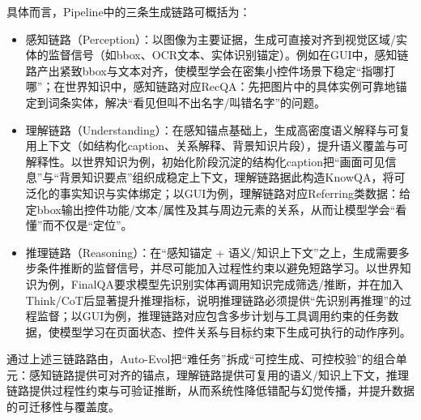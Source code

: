 具体而言，Pipeline中的三条生成链路可概括为：
\begin{itemize}
  \item 感知链路（Perception）：以图像为主要证据，生成可直接对齐到视觉区域/实体的监督信号（如bbox、OCR文本、实体识别锚定）。例如在GUI中，感知链路产出紧致bbox与文本对齐，使模型学会在密集小控件场景下稳定“指哪打哪”；在世界知识中，感知链路对应RecQA：先把图片中的具体实例可靠地锚定到词条实体，解决“看见但叫不出名字/叫错名字”的问题。
  \item 理解链路（Understanding）：在感知锚点基础上，生成高密度语义解释与可复用上下文（如结构化caption、关系解释、背景知识片段），提升语义覆盖与可解释性。以世界知识为例，初始化阶段沉淀的结构化caption把“画面可见信息”与“背景知识要点”组织成稳定上下文，理解链路据此构造KnowQA，将可泛化的事实知识与实体绑定；以GUI为例，理解链路对应Referring类数据：给定bbox输出控件功能/文本/属性及其与周边元素的关系，从而让模型学会“看懂”而不仅是“定位”。
  \item 推理链路（Reasoning）：在“感知锚定 + 语义/知识上下文”之上，生成需要多步条件推断的监督信号，并尽可能加入过程性约束以避免短路学习。以世界知识为例，FinalQA要求模型先识别实体再调用知识完成筛选/推断，并在加入Think/CoT后显著提升推理指标，说明推理链路必须提供“先识别再推理”的过程监督；以GUI为例，推理链路对应包含多步计划与工具调用约束的任务数据，使模型学习在页面状态、控件关系与目标约束下生成可执行的动作序列。
\end{itemize}
通过上述三链路路由，Auto-Evol把“难任务”拆成“可控生成、可控校验”的组合单元：感知链路提供可对齐的锚点，理解链路提供可复用的语义/知识上下文，推理链路提供过程性约束与可验证推断，从而系统性降低错配与幻觉传播，并提升数据的可迁移性与覆盖度。

